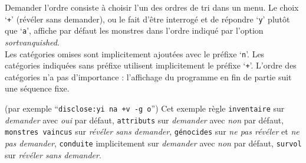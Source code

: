 \documentclass[titlepage]{article}
\begin{document}
\begin{description}[font=\mdseries\itshape]
Demander l'ordre consiste à choisir l'un des ordres de tri dans un menu.
Le choix `\texttt{+}' (révéler sans demander),
ou le fait d'être interrogé et de répondre `\texttt{y}' plutôt que `\texttt{a}',
affiche par défaut les monstres dans l'ordre indiqué par l'option
\textit{sortvanquished}.
\\
Les catégories omises sont implicitement ajoutées avec le préfixe `\texttt{n}'.
Les catégories indiquées sans préfixe utilisent implicitement le préfixe `\texttt{+}'.
L'ordre des catégories n'a pas d'importance : l'affichage du programme
en fin de partie suit une séquence fixe.

(par exemple ``\texttt{disclose:yi na +v -g o}'')
Cet exemple règle
\texttt{inventaire} sur \textit{demander} avec \textit{oui} par défaut,
\texttt{attributs} sur \textit{demander} avec \textit{non} par défaut,
\texttt{monstres vaincus} sur \textit{révéler sans demander},
\texttt{génocides} sur \textit{ne pas révéler} et \textit{ne pas demander},
\texttt{conduite} implicitement sur \textit{demander} avec \textit{non} par défaut,
\texttt{survol} sur \textit{révéler sans demander}.


\end{description}
\end{document}
